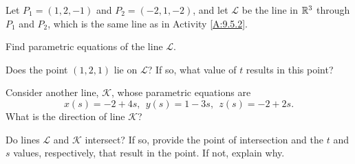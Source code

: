 \begin{activity} \label{A:9.5.3}  	Let $P_1 = (1,2,-1)$ and $P_2 = (-2,1,-2)$, and let $\mathcal{L}$ be the line in $\mathbb{R}^3$ through $P_1$ and $P_2$, which is the same line as in Activity \ref{A:9.5.2}.
	\ba
	\item Find parametric equations of the line $\mathcal{L}$.
	
	\item Does the point $(1, 2, 1)$ lie on $\mathcal{L}$? If so, what value of $t$ results in this point?
	
	\item Consider another line, $\mathcal{K}$, whose parametric equations are 
	$$x(s) = -2 + 4s, \ \ y(s) = 1-3s, \ \ z(s) = -2 + 2s.$$
	What is the direction of  line $\mathcal{K}$?
	
	\item Do lines $\mathcal{L}$ and $\mathcal{K}$ intersect?  If so, provide the point of intersection and the $t$ and $s$ values, respectively, that result in the point.  If not, explain why.

	\ea


\end{activity}
\begin{smallhint}

\end{smallhint}
\begin{bighint}

\end{bighint}
